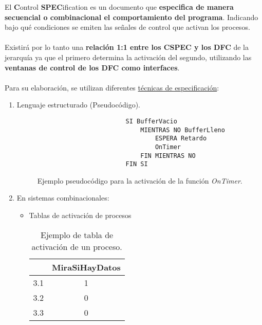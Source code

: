 El \textbf{C}ontrol \textbf{SPEC}ification es un documento que \textbf{especifica de manera secuencial o combinacional el comportamiento del programa}. Indicando bajo qué condiciones se emiten las señales de control que activan los procesos.
\\
\\
Existirá por lo tanto una \textbf{relación 1:1 entre los CSPEC y los DFC} de la jerarquía ya que el primero determina la activación del segundo, utilizando las \textbf{ventanas de control de los DFC como interfaces}.
\\
\\
Para su elaboración, se utilizan diferentes \uline{técnicas de especificación}:
\begin{enumerate}
    \item Lenguaje estructurado (Pseudocódigo). %
          \begin{figure}[h!]
              \centering
              \begin{verbatim}
                        SI BufferVacio
                            MIENTRAS NO BufferLleno
                                ESPERA Retardo
                                OnTimer
                            FIN MIENTRAS NO
                        FIN SI
  \end{verbatim}
              \caption{Ejemplo pseudocódigo para la activación de la función \emph{OnTimer}.}
          \end{figure}
    \item En sistemas combinacionales:
          \begin{itemize}
              \item Tablas de activación de procesos %
                    \begin{table}[h!]
                        \centering
                        \begin{tabular}{|c|c|} \cline{1-2}
                                & MiraSiHayDatos \\ \hline
                            3.1 & 1              \\ \hline
                            3.2 & 0              \\ \hline
                            3.3 & 0              \\ \hline
                        \end{tabular}
                        \caption{Ejemplo de tabla de activación de un proceso.}
                    \end{table}



\end{itemize}
\end{enumerate}
